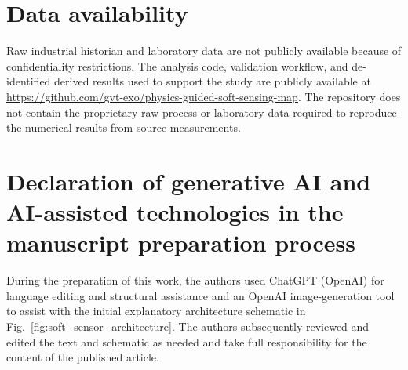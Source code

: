 \documentclass[preprint,12pt,authoryear]{elsarticle}
\begin{document}
\section*{Data availability}

Raw industrial historian and laboratory data are not publicly available because of confidentiality restrictions. The analysis code, validation workflow, and de-identified derived results used to support the study are publicly available at \url{https://github.com/gvt-exo/physics-guided-soft-sensing-map}. The repository does not contain the proprietary raw process or laboratory data required to reproduce the numerical results from source measurements.

\section*{Declaration of generative AI and AI-assisted technologies in the manuscript preparation process}

During the preparation of this work, the authors used ChatGPT (OpenAI) for language editing and structural assistance and an OpenAI image-generation tool to assist with the initial explanatory architecture schematic in Fig.~\ref{fig:soft_sensor_architecture}. The authors subsequently reviewed and edited the text and schematic as needed and take full responsibility for the content of the published article.



\end{document}
